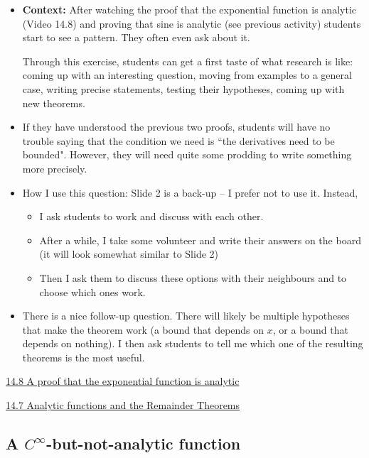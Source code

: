 \documentclass[11pt]{article}
\newcommand{\nl}{\hfill \vspace{-1.1\baselineskip}} %
\newcommand{\vvii}{\hspace{8mm}  \href{https://www.youtube.com/watch?v=SXLJOa1_GMs&list=PLlwePzQY_wW9h32ZwS6CYsY4eR_b2pE9j&index=7}{14.7 Analytic functions and the Remainder Theorems}}
\newcommand{\vviii}{\hspace{8mm}  \href{https://www.youtube.com/watch?v=lQH-pqS7vdk&list=PLlwePzQY_wW9h32ZwS6CYsY4eR_b2pE9j&index=8}{14.8 A proof that the exponential function is analytic}}
\begin{document}
\begin{comments}
\nl
	\begin{itemize}
		\item  {\bf Context:}  After watching the proof that the exponential function is analytic (Video 14.8) and proving that sine is analytic (see previous activity) students start to see a pattern.  They often even ask about it.
		
		Through this exercise, students can get a first taste of what research is like: coming up with an interesting question, moving from examples to a general case, writing precise statements, testing their hypotheses, coming up with new theorems.  

		\item If they have understood the previous two proofs, students will have no trouble saying that the condition we need is ``the derivatives need to be bounded".  However, they will need quite some prodding to write something more precisely.
		
		\item How I use this question: Slide 2 is a back-up -- I prefer not to use it.   Instead, 
			\begin{itemize}
				\item I ask students to work and discuss with each other.
				\item After a while, I take some volunteer and write their answers on the board (it will look somewhat similar to Slide 2)
				\item Then I ask them to discuss these options with their neighbours and to choose which ones work.
			\end{itemize}
			
		\item There is a nice follow-up question.  There will likely be multiple hypotheses that make the theorem work (a bound that depends on $x$, or a bound that depends on nothing).  I then ask students to tell me which one of the resulting theorems is the most useful.
	\end{itemize}
\end{comments}

\begin{videos}
\vviii

\vvii
\end{videos}

\newpage
\subsection{A $C^{\infty}$-but-not-analytic function}
\end{document}
